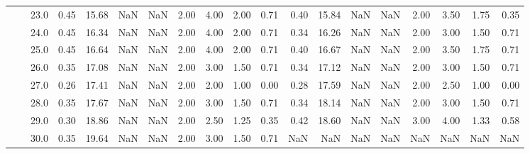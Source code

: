 \begin{tabular}{lllrrrrrrrrrrrrrrrr}
       &     & 23.0 &      0.45 &      15.68 &               NaN &                NaN & 2.00 &   4.00 &             2.00 &                         0.71 &      0.40 &      15.84 &               NaN &                NaN & 2.00 &   3.50 &             1.75 &                         0.35 \\
       &     & 24.0 &      0.45 &      16.34 &               NaN &                NaN & 2.00 &   4.00 &             2.00 &                         0.71 &      0.34 &      16.26 &               NaN &                NaN & 2.00 &   3.00 &             1.50 &                         0.71 \\
       &     & 25.0 &      0.45 &      16.64 &               NaN &                NaN & 2.00 &   4.00 &             2.00 &                         0.71 &      0.40 &      16.67 &               NaN &                NaN & 2.00 &   3.50 &             1.75 &                         0.71 \\
       &     & 26.0 &      0.35 &      17.08 &               NaN &                NaN & 2.00 &   3.00 &             1.50 &                         0.71 &      0.34 &      17.12 &               NaN &                NaN & 2.00 &   3.00 &             1.50 &                         0.71 \\
       &     & 27.0 &      0.26 &      17.41 &               NaN &                NaN & 2.00 &   2.00 &             1.00 &                         0.00 &      0.28 &      17.59 &               NaN &                NaN & 2.00 &   2.50 &             1.00 &                         0.00 \\
       &     & 28.0 &      0.35 &      17.67 &               NaN &                NaN & 2.00 &   3.00 &             1.50 &                         0.71 &      0.34 &      18.14 &               NaN &                NaN & 2.00 &   3.00 &             1.50 &                         0.71 \\
       &     & 29.0 &      0.30 &      18.86 &               NaN &                NaN & 2.00 &   2.50 &             1.25 &                         0.35 &      0.42 &      18.60 &               NaN &                NaN & 3.00 &   4.00 &             1.33 &                         0.58 \\
       &     & 30.0 &      0.35 &      19.64 &               NaN &                NaN & 2.00 &   3.00 &             1.50 &                         0.71 &       NaN &        NaN &               NaN &                NaN &  NaN &    NaN &              NaN &                          NaN \\

\end{tabular}
